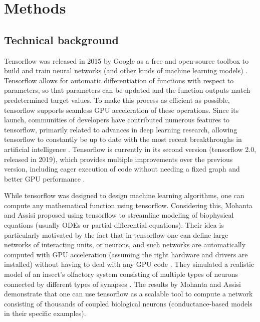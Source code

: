 \documentclass{report}
\begin{document}
\section{Methods}

\subsection{Technical background}

Tensorflow was released in 2015 by Google as a free and open-source toolbox to build and train neural networks (and other kinds of machine learning models) \cite{abadi2016tensorflow}. Tensorflow allows for automatic differentiation of functions with respect to parameters, so that parameters can be updated and the function outputs match predetermined target values. To make this process as efficient as possible, tensorflow supports seamless GPU acceleration of these operations. Since its launch, communities of developers have contributed numerous features to tensorflow, primarily related to advances in deep learning research, allowing tensorflow to constantly be up to date with the most recent breakthroughs in artificial intelligence \cite{abadi2016tensorflow}. Tensorflow is currently in its second version (tensorflow 2.0, released in 2019), which provides multiple improvements over the previous version, including eager execution of code without needing a fixed graph and better GPU performance \cite{campesato2019tensorflow}.

While tensorflow was designed to design machine learning algorithms, one can compute any mathematical function using tensorflow. Considering this, Mohanta and Assisi \cite{mohanta2019parallel} proposed using tensorflow to streamline modeling of biophysical equations (usually ODEs or partial differential equations). Their idea is particularly motivated by the fact that in tensorflow one can define large networks of interacting units, or neurons, and such networks are automatically computed with GPU acceleration (assuming the right hardware and drivers are installed) without having to deal with any GPU code \cite{mohanta2019parallel}. They simulated a realistic model of an insect's olfactory system consisting of multiple types of neurons connected by different types of synapses \cite{mohanta2019parallel}. The results by Mohanta and Assisi \cite{mohanta2019parallel} demonstrate that one can use tensorflow as a scalable tool to compute a network consisting of thousands of coupled biological neurons (conductance-based models in their specific examples).
\end{document}
